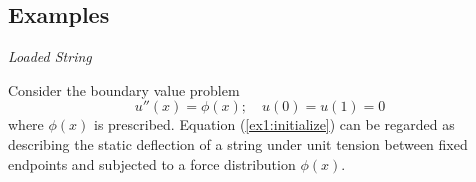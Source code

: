 \subsection{Examples}
\begin{example} %
    \textit{Loaded String}
    
    Consider the boundary value problem
    \begin{equation} \label{ex1:initialize}
        u''(x) = \phi(x);\quad u(0)=u(1)=0
    \end{equation}
    where \(\phi(x)\) is prescribed. Equation (\ref{ex1:initialize}) can be regarded as describing the static deflection of a string under unit tension between fixed endpoints and subjected to a force distribution \(\phi(x)\).

    
    

\end{example}
